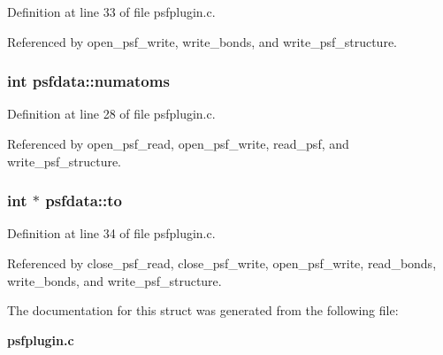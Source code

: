 Definition at line 33 of file psfplugin.c.

Referenced by open\_\-psf\_\-write, write\_\-bonds, and write\_\-psf\_\-structure.
\subsubsection{\setlength{\rightskip}{0pt plus 5cm}int psfdata::numatoms}\label{structpsfdata_m1}




Definition at line 28 of file psfplugin.c.

Referenced by open\_\-psf\_\-read, open\_\-psf\_\-write, read\_\-psf, and write\_\-psf\_\-structure.
\subsubsection{\setlength{\rightskip}{0pt plus 5cm}int $\ast$ psfdata::to}\label{structpsfdata_m8}




Definition at line 34 of file psfplugin.c.

Referenced by close\_\-psf\_\-read, close\_\-psf\_\-write, open\_\-psf\_\-write, read\_\-bonds, write\_\-bonds, and write\_\-psf\_\-structure.

The documentation for this struct was generated from the following file:\begin{CompactItemize}
\item 
{\bf psfplugin.c}\end{CompactItemize}
